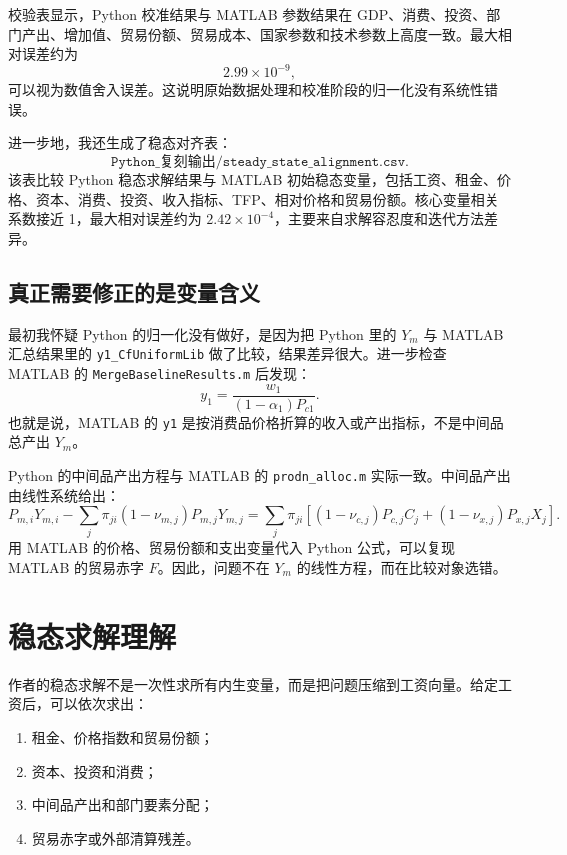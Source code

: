 \documentclass[UTF8,12pt,a4paper]{ctexart}
\begin{document}
校验表显示，Python 校准结果与 MATLAB 参数结果在 GDP、消费、投资、部门产出、增加值、贸易份额、贸易成本、国家参数和技术参数上高度一致。最大相对误差约为
\[
2.99\times 10^{-9},
\]
可以视为数值舍入误差。这说明原始数据处理和校准阶段的归一化没有系统性错误。

进一步地，我还生成了稳态对齐表：
\[
\texttt{Python\_复刻输出/steady\_state\_alignment.csv}.
\]
该表比较 Python 稳态求解结果与 MATLAB 初始稳态变量，包括工资、租金、价格、资本、消费、投资、收入指标、TFP、相对价格和贸易份额。核心变量相关系数接近 1，最大相对误差约为 $2.42\times 10^{-4}$，主要来自求解容忍度和迭代方法差异。

\subsection{真正需要修正的是变量含义}

最初我怀疑 Python 的归一化没有做好，是因为把 Python 里的 $Y_m$ 与 MATLAB 汇总结果里的 \texttt{y1\_CfUniformLib} 做了比较，结果差异很大。进一步检查 MATLAB 的 \texttt{MergeBaselineResults.m} 后发现：
\begin{equation}
y_1=\frac{w_1}{(1-\alpha_1)P_{c1}}.
\end{equation}
也就是说，MATLAB 的 \texttt{y1} 是按消费品价格折算的收入或产出指标，不是中间品总产出 $Y_m$。

Python 的中间品产出方程与 MATLAB 的 \texttt{prodn\_alloc.m} 实际一致。中间品产出由线性系统给出：
\begin{equation}
P_{m,i}Y_{m,i}
-
\sum_j \pi_{j i}(1-\nu_{m,j})P_{m,j}Y_{m,j}
=
\sum_j \pi_{j i}\left[(1-\nu_{c,j})P_{c,j}C_j+(1-\nu_{x,j})P_{x,j}X_j\right].
\end{equation}
用 MATLAB 的价格、贸易份额和支出变量代入 Python 公式，可以复现 MATLAB 的贸易赤字 $F$。因此，问题不在 $Y_m$ 的线性方程，而在比较对象选错。

\section{稳态求解理解}

作者的稳态求解不是一次性求所有内生变量，而是把问题压缩到工资向量。给定工资后，可以依次求出：
\begin{enumerate}
  \item 租金、价格指数和贸易份额；
  \item 资本、投资和消费；
  \item 中间品产出和部门要素分配；
  \item 贸易赤字或外部清算残差。
\end{enumerate}
\end{document}
